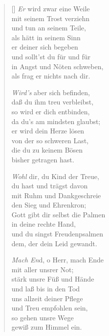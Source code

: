 \begin{multicols}{2}
\begin{verse}[\versewidth]
   \emph{Er} wird zwar eine Weile\\
  mit seinem Trost verziehn\\
  und tun an seinem Teile,\\
  als hätt in seinem Sinn\\
  er deiner sich begeben\\
  und sollt'st du für und für\\
  in Angst und Nöten schweben,\\
  als frag er nichts nach dir.

   \emph{Wird's} aber sich befinden,\\
  daß du ihm treu verbleibst,\\
  so wird er dich entbinden,\\
  da du's am mindsten glaubst;\\
  er wird dein Herze lösen\\
  von der so schweren Last,\\
  die du zu keinem Bösen\\
  bisher getragen hast.

   \emph{Wohl} dir, du Kind der Treue,\\
  du hast und trägst davon\\
  mit Ruhm und Dankgeschreie\\
  den Sieg und Ehrenkron;\\
  Gott gibt dir selbst die Palmen\\
  in deine rechte Hand,\\
  und du singst Freudenpsalmen\\
  dem, der dein Leid gewandt.

   \emph{Mach En}d, o Herr, mach Ende\\
  mit aller unsrer Not;\\
  stärk unsre Füß und Hände\\
  und laß bis in den Tod\\
  uns allzeit deiner Pflege\\
  und Treu empfohlen sein,\\
  so gehen unsre Wege\\
  gewiß zum Himmel ein.
  
  

\end{verse}
\end{multicols}

  
